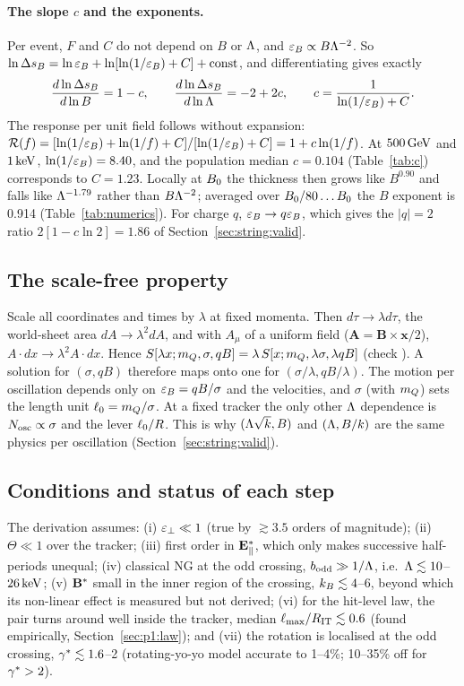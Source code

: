 \paragraph{The slope $c$ and the exponents.} Per event, $F$ and $C$ do not depend on $B$ or $\Lambda$, and $\varepsilon_B\propto
B\Lambda^{-2}$. So $\ln\Delta s_B=\ln\varepsilon_B+\ln[\ln(1/\varepsilon_B)+C]+{\rm const}$, and differentiating gives exactly
\begin{equation}
  \frac{d\ln\Delta s_B}{d\ln B}=1-c,\qquad \frac{d\ln\Delta s_B}{d\ln\Lambda}=-2+2c,\qquad c=\frac{1}{\ln(1/\varepsilon_B)+C}.
\end{equation}
The response per unit field follows without expansion:
$\mathcal R(f)=[\ln(1/\varepsilon_B)+\ln(1/f)+C]/[\ln(1/\varepsilon_B)+C]=1+c\ln(1/f)$. At $500\,\mathrm{GeV}$ and $1\,\mathrm{keV}$, $\ln(1/\varepsilon_B)=8.40$, and
the population median $c=0.104$ (Table~\ref{tab:c}) corresponds to $C=1.23$. Locally at $B_0$ the thickness then
grows like $B^{0.90}$ and falls like $\Lambda^{-1.79}$ rather than $B\Lambda^{-2}$; averaged over $B_0/80\ldots B_0$
the $B$ exponent is 0.914 (Table~\ref{tab:numerics}). For charge $q$, $\varepsilon_B\to q\varepsilon_B$, which gives the $|q|=2$ ratio $2[1-c\ln2]=1.86$ of
Section~\ref{sec:string:valid}.

\subsection{The scale-free property}\label{app:der:scale}
Scale all coordinates and times by $\lambda$ at fixed momenta. Then $d\tau\to\lambda d\tau$, the world-sheet area
$dA\to\lambda^2dA$, and with $A_\mu$ of a uniform field ($\mathbf A=\mathbf B\times\mathbf x/2$), $A\cdot dx\to\lambda^2A\cdot
dx$. Hence $S[\lambda x;m_Q,\sigma,qB]=\lambda\,S[x;m_Q,\lambda\sigma,\lambda qB]$ (check ). A solution for
$(\sigma,qB)$ therefore maps onto one for $(\sigma/\lambda,qB/\lambda)$. The motion per oscillation depends only on
$\varepsilon_B=qB/\sigma$ and the velocities, and $\sigma$ (with $m_Q$) sets the length unit $\ell_0=m_Q/\sigma$. At a fixed tracker the only other
$\Lambda$ dependence is $N_{\rm osc}\propto\sigma$ and the lever $\ell_0/R$. This is why $(\Lambda\sqrt k,B)$ and $(\Lambda,B/k)$ are the
same physics per oscillation (Section~\ref{sec:string:valid}).

\subsection{Conditions and status of each step}\label{app:der:status}
The derivation assumes: (i) $\varepsilon_\perp\ll1$ (true by $\gtrsim3.5$ orders of magnitude); (ii) $\Theta\ll1$ over the tracker;
(iii) first order in $\mathbf{E}^*_\parallel$, which only makes successive half-periods unequal; (iv) classical NG at the odd
crossing, $b_{\rm odd}\gg1/\Lambda$, i.e.\ $\Lambda\lesssim10$--$26\,\mathrm{keV}$; (v) $\mathbf{B}^*$ small in the inner region of the crossing,
$k_B\lesssim4$--6, beyond which its non-linear effect is measured but not derived; (vi) for the hit-level law, the
pair turns around well inside the tracker, median $\ell_{\max}/R_{\rm IT}\lesssim0.6$ (found empirically,
Section~\ref{sec:p1:law}); and (vii) the rotation is localised at the odd crossing, $\gamma^*\lesssim1.6$--2 (rotating-yo-yo
model accurate to 1--4\%; 10--35\% off for $\gamma^*>2$).

